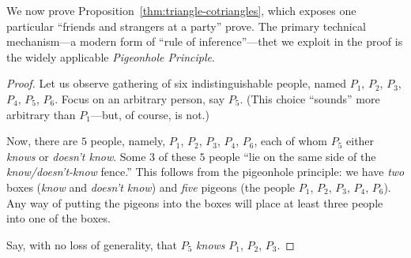 We now prove Proposition~\ref{thm:triangle-cotriangles}, which exposes
one particular ``friends and strangers at a party'' prove.  The
primary technical mechanism---a modern form of ``rule of
inference''---thet we exploit in the proof is the widely applicable
{\it Pigeonhole Principle}. 

\bigskip

\noindent {}

\bigskip

\begin{proof}
Let us observe gathering of six indistinguishable people, named $P_1$,
$P_2$, $P_3$, $P_4$, $P_5$, $P_6$.  Focus on an arbitrary person, say
$P_5$.  (This choice ``sounds'' more arbitrary than $P_1$---but, of
course, is not.)

Now, there are $5$ people, namely, $P_1$, $P_2$, $P_3$, $P_4$, $P_6$,
each of whom $P_5$ either {\em knows} or {\em doesn't know}.  Some $3$
of these $5$ people ``lie on the same side of the {\em
  know/doesn't-know} fence.''  This follows from the pigeonhole
principle: we have {\em two} boxes ({\em know} and {\em doesn't know})
and {\em five} pigeons (the people $P_1$, $P_2$, $P_3$, $P_4$, $P_6$).
Any way of putting the pigeons into the boxes will place at least
three people into one of the boxes.

Say, with no loss of generality, that $P_5$ {\em knows} $P_1$, $P_2$,
$P_3$. 
\medskip

\noindent {}
\end{proof}
